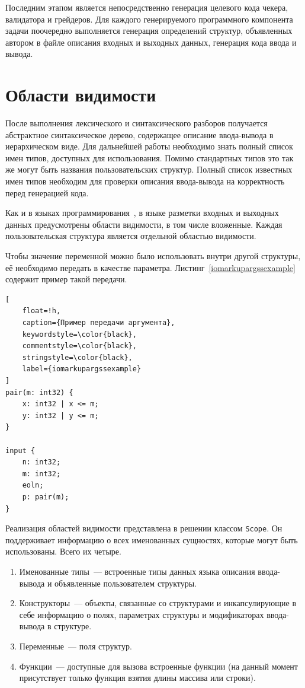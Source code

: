 \documentclass[times,specification,annotation]{style/itmo-student-thesis/itmo-student-thesis}
\begin{document}
Последним этапом является непосредственно генерация целевого кода чекера, валидатора и грейдеров. Для каждого генерируемого программного компонента задачи поочередно выполняется генерация определений структур, объявленных автором в файле описания входных и выходных данных, генерация кода ввода и вывода.

\section{Области видимости}

После выполнения лексического и синтаксического разборов получается абстрактное синтаксическое дерево, содержащее описание ввода-вывода в иерархическом виде. Для дальнейшей работы необходимо знать полный список имен типов, доступных для использования. Помимо стандартных типов это так же могут быть названия пользовательских структур. Полный список известных имен типов необходим для проверки описания ввода-вывода на корректность перед генерацией кода.

Как и в языках программирования~\cite{aho-compilers}, в языке разметки входных и выходных данных предусмотрены области видимости, в том числе вложенные. Каждая пользовательская структура является отдельной областью видимости.

Чтобы значение переменной можно было использовать внутри другой структуры, её необходимо передать в качестве параметра. Листинг~\ref{iomarkupargssexample} содержит пример такой передачи.

\begin{lstlisting}[
    float=!h,
    caption={Пример передачи аргумента},
    keywordstyle=\color{black},
    commentstyle=\color{black},
    stringstyle=\color{black},
    label={iomarkupargssexample}
]
pair(m: int32) {
    x: int32 | x <= m;
    y: int32 | y <= m;
}

input {
    n: int32;
    m: int32;
    eoln;
    p: pair(m);
}

\end{lstlisting}

Реализация областей видимости представлена в решении классом \texttt{Scope}. Он поддерживает информацию о всех именованных сущностях, которые могут быть использованы. Всего их четыре.

\begin{enumerate}[leftmargin=1.75cm]
    \item Именованные типы~--- встроенные типы данных языка описания ввода-вывода и объявленные пользователем структуры.
    \item Конструкторы~--- объекты, связанные со структурами и инкапсулирующие в себе информацию о полях, параметрах структуры и модификаторах ввода-вывода в структуре.
    \item Переменные~--- поля структур.
    \item Функции~--- доступные для вызова встроенные функции (на данный момент присутствует только функция взятия длины массива или строки).
\end{enumerate}
\end{document}
